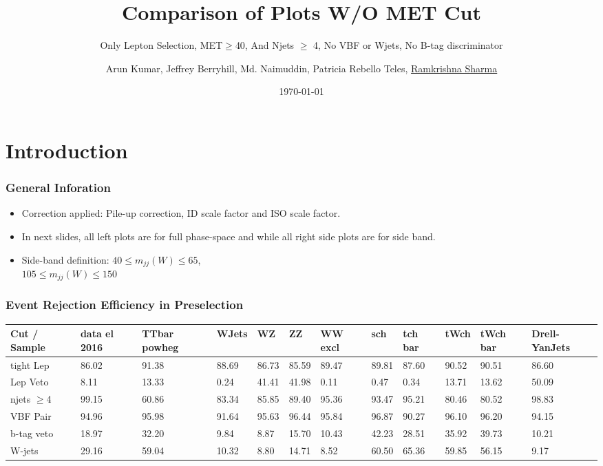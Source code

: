\documentclass[slidestop,compress,mathserif]{beamer}
\title[Priliminary Plots]{Comparison of Plots W/O MET Cut}
\subtitle{Only Lepton Selection, MET$\ge$40, And Njets $\ge$ 4, No VBF or Wjets, No B-tag discriminator}
\date[\today]{\today}
\author[Ram krishna Sharma]{
		Arun Kumar\inst{2}, 
		Jeffrey Berryhill\inst{4},
		Md. Naimuddin\inst{1},
		Patricia Rebello Teles\inst{3}, 
		\underline{Ramkrishna Sharma}\inst{1}
		}
\institute[Delhi,INDIA]{
			\inst{1}University of Delhi, 
			\inst{2}National Taiwan University, 
			\inst{3}Brazilian Center for Physics Research,
			\inst{4}Fermi National Accelerator Laboratory
		}
\begin{document}
\renewcommand{\inserttotalframenumber}{\pageref{lastslide}}
\begin{frame}
\titlepage
\end{frame}

\section{Introduction}
\begin{frame}\frametitle{General Inforation}
    \begin{itemize}
        \item Correction applied: Pile-up correction, ID scale factor and ISO scale factor.
        \item In next slides, all left plots are for full phase-space and while all right side plots are for side band.
		\item Side-band definition: $40\le m_{jj}(W) \le 65$,\\
				\hspace{3.4cm} $105\le m_{jj}(W) \le 150$
    \end{itemize}
\end{frame}

\begin{frame}\frametitle{Event Rejection Efficiency in Preselection}
{\scriptsize \begin{tabular}{|p{0.6cm}|p{0.6cm}|p{0.6cm}|p{0.6cm}|p{0.6cm}|p{0.6cm}|p{0.6cm}|p{0.6cm}|p{0.6cm}|p{0.6cm}|p{0.6cm}|p{0.6cm}|}
        \hline
Cut / Sample    &   data el 2016    &   TTbar powheg    &   WJets   &   WZ  &   ZZ  &   WW excl &   sch &tch bar    &   tWch    &   tWch bar    &   Drell-YanJets\\
        \hline
tight Lep   &   86.02   &   91.38   &   88.69   &   86.73   &   85.59   &   89.47   &   89.81   &   87.60   &90.52  &   90.51   &   86.60\\
        \hline
Lep Veto    &   8.11    &   13.33   &   0.24    &   41.41   &   41.98   &   0.11    &   0.47    &   0.34    &   13.71   &   13.62   &   50.09\\
        \hline
njets $\ge$4    &   99.15   &   60.86   &   83.34   &   85.85   &   89.40   &   95.36   &   93.47   &   95.21   &   80.46   &   80.52   &   98.83\\
        \hline
VBF Pair    &   94.96   &   95.98   &   91.64   &   95.63   &   96.44   &   95.84   &   96.87   &   90.27   &96.10  &   96.20   &   94.15\\
        \hline
b-tag veto  &   18.97   &   32.20   &   9.84    &   8.87    &   15.70   &   10.43   &   42.23   &   28.51   &   35.92   &   39.73   &   10.21\\
        \hline
W-jets  &   29.16   &   59.04   &   10.32   &   8.80    &   14.71   &   8.52    &   60.50   &   65.36   &59.85  &   56.15   &   9.17\\
    \hline
\end{tabular}}
\end{frame}
\end{document}
